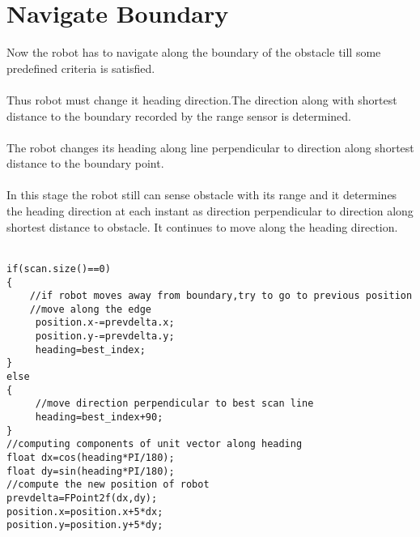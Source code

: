 \documentclass[fontsize=12pt, %
                             paper=a4, %
                             oneside, %
                             captions=tableheading,
                             index=totoc,
                             hyperref]{labbook}
\begin{document}
\section{Navigate Boundary}
Now the robot has to navigate along the boundary of the obstacle
till some predefined criteria is satisfied.
\\\\
Thus robot must change it heading direction.The direction
along with shortest distance to the boundary recorded by the range sensor is determined.
\\\\
The robot changes its heading along line perpendicular to
direction along shortest distance to the boundary point.
\\\\
In this stage the robot still can sense obstacle with its range
and it determines the heading direction at each instant as direction
perpendicular to direction along shortest distance to obstacle.
It continues to move along the heading direction.
\\\\
\begin{verbatim}
if(scan.size()==0)
{
    //if robot moves away from boundary,try to go to previous position
    //move along the edge
     position.x-=prevdelta.x;
     position.y-=prevdelta.y;
     heading=best_index;
}
else
{
     //move direction perpendicular to best scan line
     heading=best_index+90;
}
//computing components of unit vector along heading
float dx=cos(heading*PI/180);
float dy=sin(heading*PI/180);
//compute the new position of robot
prevdelta=FPoint2f(dx,dy);
position.x=position.x+5*dx;
position.y=position.y+5*dy;
\end{verbatim}
\end{document}
